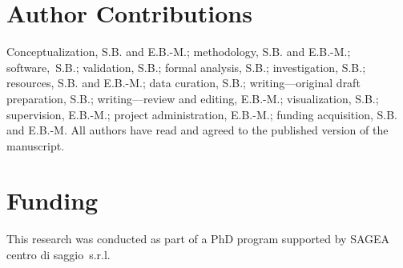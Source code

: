 \documentclass[12pt,a4paper,oneside]{report}
\newcommand{\authorcontributions}[1]{\section*{Author Contributions}#1}
\newcommand{\funding}[1]{\section*{Funding}#1}
\begin{document}


\authorcontributions{Conceptualization, S.B. and E.B.-M.; methodology, S.B. and E.B.-M.; \mbox{software, S.B.}; validation, S.B.; formal analysis, S.B.; investigation, S.B.; resources, S.B. and \mbox{E.B.-M.}; data curation, S.B.; writing---original draft preparation, S.B.; writing---review and editing, E.B.-M.; visualization, S.B.; supervision, E.B.-M.; project administration, E.B.-M.; funding acquisition, S.B. and E.B.-M. All authors have read and agreed to the published version of the manuscript.}

\funding{This research was conducted as part of a PhD program supported by SAGEA centro di saggio~s.r.l.}

\end{document}
